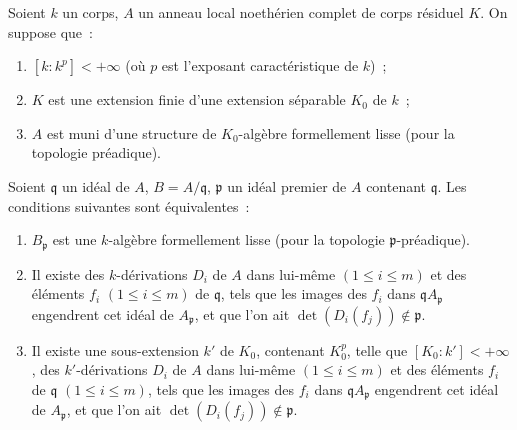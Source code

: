 \begin{theorem}[22.7.3]
\label{0.22.7.3-fr}
Soient $k$ un corps, $A$ un anneau local noethérien complet de corps résiduel
$K$. On suppose que~:
\begin{enumerate}
  \item[$1^\circ$] $[k:k^p]<+\infty$ (où $p$ est l'exposant caractéristique
  de $k$)~;
  \item[$2^\circ$] $K$ est une extension finie d'une extension séparable
  $K_0$ de $k$~;
  \item[$3^\circ$] $A$ est muni d'une structure de $K_0$-algèbre formellement
  lisse (pour la topologie préadique).
\end{enumerate}
Soient $\mathfrak q$ un idéal de $A$, $B=A/\mathfrak q$, $\mathfrak p$ un
idéal premier de $A$ contenant $\mathfrak q$. Les conditions suivantes sont
équivalentes~:
\begin{enumerate}
  \item[a)] $B_{\mathfrak p}$ est une $k$-algèbre formellement lisse (pour la
  topologie $\mathfrak p$-préadique).
  \item[b)] Il existe des $k$-dérivations $D_i$ de $A$ dans lui-même
  $(1\leq i\leq m)$ et des éléments $f_i$ $(1\leq i\leq m)$ de
  $\mathfrak q$, tels que les images des $f_i$ dans
  $\mathfrak qA_{\mathfrak p}$ engendrent cet idéal de $A_{\mathfrak p}$, et
  que l'on ait $\det(D_i(f_j))\notin\mathfrak p$.
  \item[b')] Il existe une sous-extension $k'$ de $K_0$, contenant $K_0^p$,
  telle que $[K_0:k']<+\infty$, des $k'$-dérivations $D_i$ de $A$ dans
  lui-même $(1\leq i\leq m)$ et des éléments $f_i$ de $\mathfrak q$
  $(1\leq i\leq m)$, tels que les images des $f_i$ dans
  $\mathfrak qA_{\mathfrak p}$ engendrent cet idéal de $A_{\mathfrak p}$, et
  que l'on ait $\det(D_i(f_j))\notin\mathfrak p$.
\end{enumerate}
\end{theorem}

